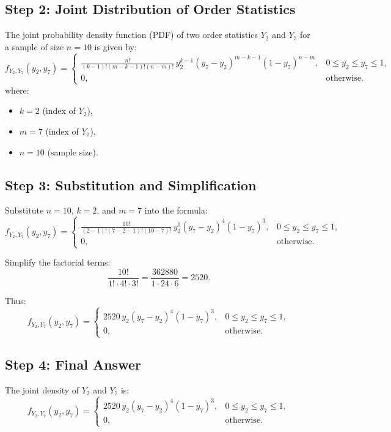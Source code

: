 \documentclass{article}
\begin{document}
\subsection*{Step 2: Joint Distribution of Order Statistics}
The joint probability density function (PDF) of two order statistics $Y_2$ and $Y_7$ for a sample of size $n = 10$ is given by:
\[
f_{Y_2, Y_7}(y_2, y_7) = 
\begin{cases} 
\frac{n!}{(k-1)!(m-k-1)!(n-m)!} \, y_2^{k-1} (y_7 - y_2)^{m-k-1} (1 - y_7)^{n-m}, & 0 \leq y_2 \leq y_7 \leq 1, \\
0, & \text{otherwise}.
\end{cases}
\]
where:
\begin{itemize}
    \item $k = 2$ (index of $Y_2$),
    \item $m = 7$ (index of $Y_7$),
    \item $n = 10$ (sample size).
\end{itemize}

\subsection*{Step 3: Substitution and Simplification}
Substitute $n = 10$, $k = 2$, and $m = 7$ into the formula:
\[
f_{Y_2, Y_7}(y_2, y_7) = 
\begin{cases} 
\frac{10!}{(2-1)!(7-2-1)!(10-7)!} \, y_2^{1} (y_7 - y_2)^{4} (1 - y_7)^{3}, & 0 \leq y_2 \leq y_7 \leq 1, \\
0, & \text{otherwise}.
\end{cases}
\]

Simplify the factorial terms:
\[
\frac{10!}{1! \cdot 4! \cdot 3!} = \frac{362880}{1 \cdot 24 \cdot 6} = 2520.
\]

Thus:
\[
f_{Y_2, Y_7}(y_2, y_7) = 
\begin{cases} 
2520 \, y_2 (y_7 - y_2)^4 (1 - y_7)^3, & 0 \leq y_2 \leq y_7 \leq 1, \\
0, & \text{otherwise}.
\end{cases}
\]

\subsection*{Step 4: Final Answer}
The joint density of $Y_2$ and $Y_7$ is:
\[
f_{Y_2, Y_7}(y_2, y_7) = 
\begin{cases} 
2520 \, y_2 (y_7 - y_2)^4 (1 - y_7)^3, & 0 \leq y_2 \leq y_7 \leq 1, \\
0, & \text{otherwise}.
\end{cases}
\]
\end{document}
